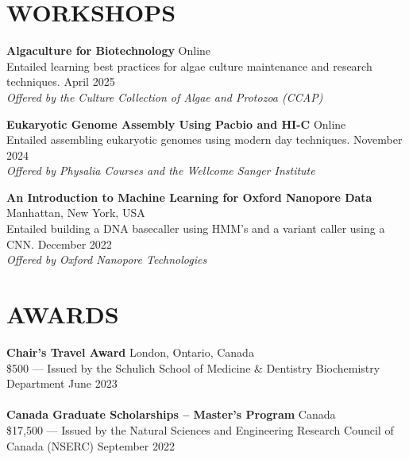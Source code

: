 \documentclass[a4paper,9pt]{extarticle}
\begin{document}
\section*{WORKSHOPS}

\begin{minipage}{1\textwidth}
	\setlength{\parindent}{15pt} %
		\noindent
		\textbf{Algaculture for Biotechnology}  \hfill Online\\ 
		Entailed learning best practices for algae culture maintenance and research techniques.  \hfill April 2025\\
		\textit{Offered by the Culture Collection of Algae and Protozoa (CCAP)}
	\end{minipage}

\begin{minipage}{1\textwidth}
\setlength{\parindent}{15pt} %
	\noindent
	\textbf{Eukaryotic Genome Assembly Using Pacbio and HI-C}  \hfill Online\\ 
	Entailed assembling eukaryotic genomes using modern day techniques.  \hfill November 2024\\
	\textit{Offered by Physalia Courses and the Wellcome Sanger Institute}
\end{minipage}


\begin{minipage}{1\textwidth}
	\setlength{\parindent}{15pt} %
		\noindent
		\textbf{An Introduction to Machine Learning for Oxford Nanopore Data}  \hfill Manhattan, New York, USA\\ 
		Entailed building a DNA basecaller using HMM's and a variant caller using a CNN.  \hfill December 2022\\
		\textit{Offered by Oxford Nanopore Technologies}
	\end{minipage}
	

\section*{AWARDS}
\noindent
\begin{minipage}{1\textwidth}
\setlength{\parindent}{15pt} %
	\noindent
	\textbf{Chair's Travel Award}  \hfill London, Ontario, Canada\\ 
	\$500 --- Issued by the Schulich School of Medicine \& Dentistry Biochemistry Department \hfill June 2023\\ \\
	\textbf{Canada Graduate Scholarships -- Master's Program}  \hfill Canada\\ 
	\$17,500 --- Issued by the Natural Sciences and Engineering Research Council of Canada (NSERC) \hfill September 2022\\ 
\end{minipage}
\end{document}
